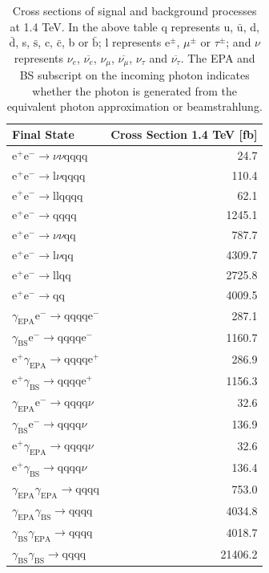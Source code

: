 \begin{table}[h!]
\centering
\begin{tabular}{ l r }
\hline
Final State & Cross Section 1.4 TeV [fb] \\ 
\hline
$\text{e}^{+}\text{e}^{-} \rightarrow \nu{\nu}\text{qqqq}$ & 24.7 \\
$\text{e}^{+}\text{e}^{-} \rightarrow \text{l}\nu\text{qqqq}$ & 110.4\\
$\text{e}^{+}\text{e}^{-} \rightarrow \text{llqqqq}$ & 62.1\\
$\text{e}^{+}\text{e}^{-} \rightarrow \text{qqqq}$ & 1245.1\\
$\text{e}^{+}\text{e}^{-} \rightarrow \nu{\nu}\text{qq}$ & 787.7\\
$\text{e}^{+}\text{e}^{-} \rightarrow \text{l}\nu\text{qq}$ & 4309.7\\
$\text{e}^{+}\text{e}^{-} \rightarrow \text{llqq}$ & 2725.8\\
$\text{e}^{+}\text{e}^{-} \rightarrow \text{qq}$ & 4009.5\\
$\gamma_{\text{EPA}}\text{e}^{-} \rightarrow \text{qqqq}\text{e}^{-}$ & 287.1\\
$\gamma_{\text{BS}}\text{e}^{-} \rightarrow \text{qqqq}\text{e}^{-}$ & 1160.7\\
$\text{e}^{+}\gamma_{\text{EPA}} \rightarrow \text{qqqq}\text{e}^{+}$ & 286.9\\
$\text{e}^{+}\gamma_{\text{BS}} \rightarrow \text{qqqq}\text{e}^{+}$ & 1156.3\\
$\gamma_{\text{EPA}}\text{e}^{-} \rightarrow \text{qqqq}\nu$ & 32.6\\
$\gamma_{\text{BS}}\text{e}^{-} \rightarrow \text{qqqq}\nu$ & 136.9\\
$\text{e}^{+}\gamma_{\text{EPA}} \rightarrow \text{qqqq}\nu$ & 32.6\\
$\text{e}^{+}\gamma_{\text{BS}} \rightarrow \text{qqqq}\nu$ & 136.4\\
$\gamma_{\text{EPA}}\gamma_{\text{EPA}} \rightarrow \text{qqqq}$ & 753.0\\
$\gamma_{\text{EPA}}\gamma_{\text{BS}} \rightarrow \text{qqqq}$ & 4034.8\\
$\gamma_{\text{BS}}\gamma_{\text{EPA}} \rightarrow \text{qqqq}$ & 4018.7\\
$\gamma_{\text{BS}}\gamma_{\text{BS}} \rightarrow \text{qqqq}$ & 21406.2\\
\hline
\end{tabular}
\caption[Cross sections of signal and background processes at 1.4 TeV]{Cross sections of signal and background processes at 1.4 TeV.  In the above table q represents u, $\bar{\text{u}}$, d, $\bar{\text{d}}$, s, $\bar{\text{s}}$, c, $\bar{\text{c}}$, b or $\bar{\text{b}}$;  l represents $\text{e}^{\pm}$, $\mu^{\pm}$ or $\tau^{\pm}$; and $\nu$ represents $\nu_{e}$, $\overline{\nu_{e}}$, $\nu_{\mu}$, $\overline{\nu_{\mu}}$, $\nu_{\tau}$ and $\overline{\nu_{\tau}}$.  The EPA and BS subscript on the incoming photon indicates whether the photon is generated from the equivalent photon approximation or beamstrahlung.}
\label{table:crosssection1400GeV}
\end{table}

